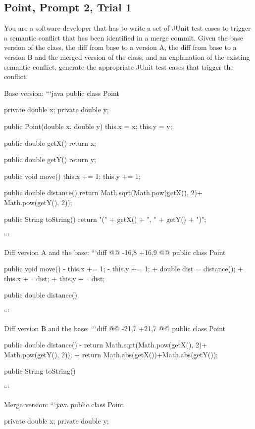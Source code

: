 \subsection{Point, Prompt 2, Trial 1}

\begin{prompt}
  You are a software developer that has to write a set of JUnit test cases to trigger a semantic conflict that has been identified in a merge commit. 
  Given the base version of the class, the diff from base to a version A, the diff from base to a version B and the merged version of the class, and an explanation of the existing semantic conflict, generate the appropriate JUnit test cases that trigger the conflict.
  
  Base version:
  ```java
  public class Point {
      private double x;
      private double y;
  
      public Point(double x, double y) {
          this.x = x;
          this.y = y;
      }
  
      public double getX() {
          return x;
      }
  
      public double getY() {
          return y;
      }
  
       public void move() {
           this.x += 1;
           this.y += 1;
       }
  
      public double distance() {
          return Math.sqrt(Math.pow(getX(), 2)+ Math.pow(getY(), 2));
      }
  
      public String toString() {
          return "(" + getX() + ", " + getY() + ")";
      }
  }
  ```
  
  Diff version A and the base:
  ```diff
  @@ -16,8 +16,9 @@ public class Point {
       }
  
        public void move() {
  -         this.x += 1;
  -         this.y += 1;
  +         double dist = distance();
  +         this.x += dist;
  +         this.y += dist;
        }
  
       public double distance() {
  ```
  
  Diff version B and the base:
  ```diff
  @@ -21,7 +21,7 @@ public class Point {
        }
  
       public double distance() {
  -        return Math.sqrt(Math.pow(getX(), 2)+ Math.pow(getY(), 2));
  +        return Math.abs(getX())+Math.abs(getY());
       }
  
       public String toString() {
  ```
  
  Merge version:
  ```java
  public class Point {
      private double x;
      private double y;
  
}}}
\end{prompt}
